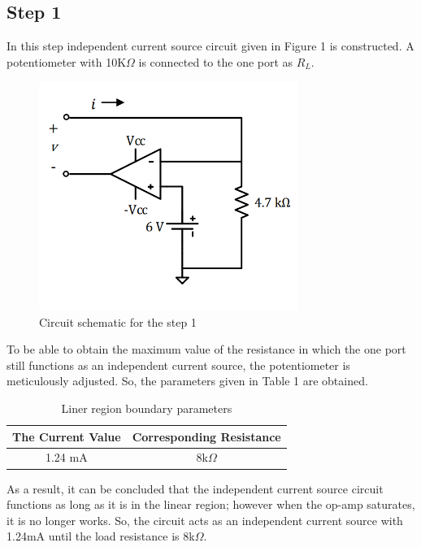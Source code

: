 \documentclass[letterpaper,12pt]{article}
\begin{document}
\subsection{Step 1}
In this step independent current source circuit given in Figure 1 is constructed. A potentiometer with 10K\(\Omega\) is connected to the one port as \(R_L\).
\begin{figure}[H]
    \centering
    \includegraphics[width = 0.75\textwidth]{1SCH.png}
    \caption{Circuit schematic for the step 1}
\end{figure} 
To be able to obtain the maximum value of the resistance in which the one port still functions as an independent current source, the potentiometer is meticulously adjusted. So, the parameters given in Table 1 are obtained.
\begin{table}[H]
    \begin{center}
        \caption{Liner region boundary parameters}
        \vspace{2mm}
        \begin{tabular}{||c | c ||} 
            \hline
            The Current Value & Corresponding Resistance \\ [0.5ex] 
            \hline\hline
            1.24 mA & 8k\(\Omega\)    \\
            \hline
        \end{tabular}
    \end{center}
\end{table}

As a result, it can be concluded that the independent current source circuit functions as long as it is in the linear region; however when the op-amp saturates, it is no longer works. So, the circuit acts as an independent current source with 1.24mA until the load resistance is 8k\(\Omega\). 
\end{document}
